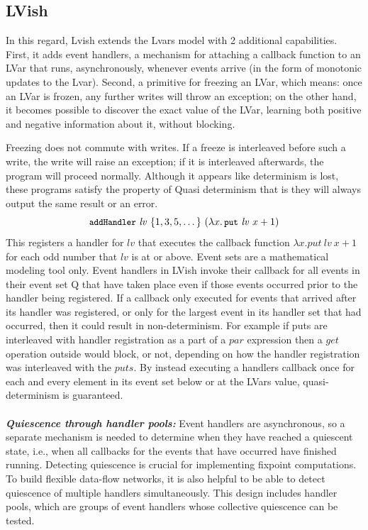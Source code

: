 \documentclass[twocolumn]{article}
\newcommand\termfont[1]{\mbox{\small{\texttt{#1}}}}
\newcommand{\lam}[2]{\ensuremath{\lambda#1.\,#2}}
\newcommand{\PUT}{\termfont{put}}
\newcommand{\putexp}[2]{\ensuremath{\PUT~#1~#2}}
\newcommand{\ADDHANDLER}{{\termfont{addHandler}}}
\begin{document}
\subsection{LVish}
In this regard, Lvish\cite{lkuper2} extends the Lvars model with 2 additional capabilities. First, it adds event handlers, a mechanism for attaching a callback function to an LVar that runs, asynchronously, whenever events arrive (in the form of monotonic updates to the Lvar). Second, a primitive for freezing an LVar, which means: once an LVar is frozen, any further writes will throw an exception; on the other hand, it becomes possible to discover the exact value of the LVar, learning both positive and negative information about it, without blocking.\par
Freezing does not commute with writes. If a freeze is interleaved before such a write, the write will raise an exception; if it is interleaved afterwards, the program will proceed normally. Although it appears like determinism is lost, these programs satisfy the property of Quasi determinism that is they will always output the same result or an error.
\vspace{-8mm}
\singlespacing
\begin{equation}
\ADDHANDLER~\mathit{lv}~\{ 1, 3, 5, \dots \}~(\lam{x}{\putexp{\mathit{lv}}{x+1}})
\label{e:lvish-example-1}
\end{equation}
This registers a handler for $lv$ that executes the callback function $\lambda{x}.put\ lv\ x + 1$ for each odd number that $lv$ is at or above. Event sets are a mathematical modeling tool only. Event handlers in LVish invoke their callback for all events in their event set Q that have taken place even if those events occurred prior to the handler being registered. If a callback only executed for events that arrived after its handler was registered, or only for the largest event in its handler set that had occurred, then it could result in non-determinism. For example if puts are interleaved with handler registration as a part of a $par$ expression then a $get$ operation outside would block, or not, depending on how the handler registration was interleaved with the $puts$. By instead executing a handlers callback once for each and every element in its event set below or at the LVars value, quasi-determinism is guaranteed. \\ \\
\textbf{\textit{Quiescence through handler pools:}} Event handlers are asynchronous, so a separate mechanism is needed to determine when they have reached a quiescent state, i.e., when all callbacks for the events that have occurred have finished running. Detecting quiescence is crucial for implementing fixpoint computations. To build flexible data-flow networks, it is also helpful to be able to detect quiescence of multiple handlers simultaneously. This design includes handler pools, which are groups of event handlers whose collective quiescence can be tested.
\end{document}
